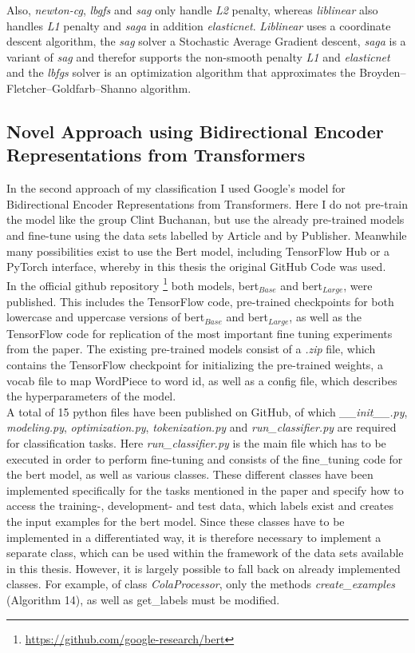 \documentclass[a4paper, 11pt,titlepage,oneside,openany]{book}
\begin{document}
\newpage \noindent Also, \textit{newton-cg}, \textit{lbgfs} and \textit{sag} only handle \textit{L2} penalty, whereas \textit{liblinear} also handles \textit{L1} penalty and \textit{saga} in addition \textit{elasticnet}. \textit{Liblinear} uses a coordinate descent algorithm, the \textit{sag} solver a Stochastic Average Gradient descent, \textit{saga} is a variant of \textit{sag} and therefor supports the non-smooth penalty \textit{L1} and \textit{elasticnet} and the \textit{lbfgs} solver is an optimization algorithm that approximates the Broyden–Fletcher–Goldfarb–Shanno algorithm.\\


\subsection{Novel Approach using Bidirectional Encoder Representations from Transformers}
In the second approach of my classification I used Google's model for Bidirectional Encoder Representations from Transformers. Here I do not pre-train the model like the group Clint Buchanan, but use the already pre-trained models and fine-tune using the data sets labelled by Article and by Publisher. Meanwhile many possibilities exist to use the Bert model, including TensorFlow Hub or a PyTorch \cite{pytorch} interface, whereby in this thesis the original GitHub Code was used.\\
\indent In the official github repository \footnote{\url{https://github.com/google-research/bert}}  both models, \gls{bert}$_{Base}$ and \gls{bert}$_{Large}$, were published. This includes the TensorFlow \cite{tensorflow} code, pre-trained checkpoints for both lowercase and uppercase versions of \gls{bert}$_{Base}$ and \gls{bert}$_{Large}$, as well as the TensorFlow code for replication of the most important fine tuning experiments from the paper. The existing pre-trained models consist of a \textit{.zip} file, which contains the TensorFlow checkpoint for initializing the pre-trained weights, a vocab file to map WordPiece to word id, as well as a config file, which describes the hyperparameters of the model. \\ 
\indent A total of 15 python files have been published on GitHub, of which \textit{\_\_init\_\_.py}, \textit{modeling.py}, \textit{optimization.py}, \textit{tokenization.py} and \textit{run\_classifier.py} are required for classification tasks. Here \textit{run\_classifier.py} is the main file which has to be executed in order to perform fine-tuning and consists of the fine\_tuning code for the \gls{bert} model, as well as various classes. These different classes have been implemented specifically for the tasks mentioned in the paper and specify how to access the training-, development- and test data, which labels exist and creates the input examples for the \gls{bert} model. Since these classes have to be implemented in a differentiated way, it is therefore necessary to implement a separate class, which can be used within the framework of the data sets available in this thesis. However, it is largely possible to fall back on already implemented classes. For example, of class \textit{ColaProcessor}, only the methods \textit{ create\_examples} (Algorithm 14), as well as get\_labels must be modified. 
\end{document}
